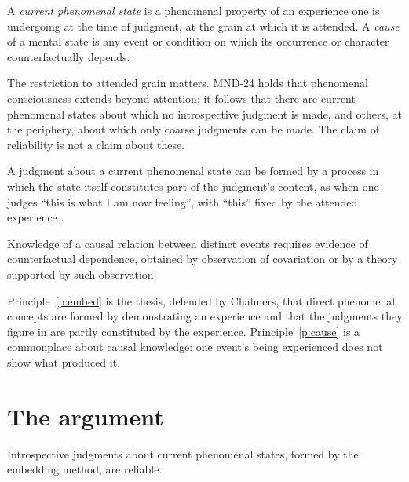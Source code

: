 \documentclass{situationist-preprint}
\begin{document}
\begin{definition}\label{d:classes}
A \emph{current phenomenal state} is a phenomenal property of an experience one is undergoing at the time of judgment, at the grain at which it is attended. A \emph{cause} of a mental state is any event or condition on which its occurrence or character counterfactually depends.
\end{definition}

The restriction to attended grain matters. MND-24 holds that phenomenal consciousness extends beyond attention; it follows that there are current phenomenal states about which no introspective judgment is made, and others, at the periphery, about which only coarse judgments can be made. The claim of reliability is not a claim about these.

\begin{principle}[Embedding]\label{p:embed}
A judgment about a current phenomenal state can be formed by a process in which the state itself constitutes part of the judgment's content, as when one judges \enquote{this is what I am now feeling}, with \enquote{this} fixed by the attended experience \citep{Chalmers2003}.
\end{principle}

\begin{principle}\label{p:cause}
Knowledge of a causal relation between distinct events requires evidence of counterfactual dependence, obtained by observation of covariation or by a theory supported by such observation.
\end{principle}

Principle~\ref{p:embed} is the thesis, defended by Chalmers, that direct phenomenal concepts are formed by demonstrating an experience and that the judgments they figure in are partly constituted by the experience. Principle~\ref{p:cause} is a commonplace about causal knowledge: one event's being experienced does not show what produced it.

\section{The argument}

\begin{lemma}\label{l:states}
Introspective judgments about current phenomenal states, formed by the embedding method, are reliable.
\end{lemma}
\end{document}
